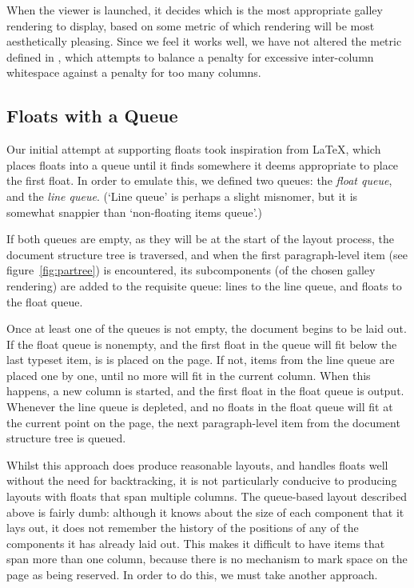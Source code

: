 
When the viewer is launched, it decides which is the most appropriate galley rendering to display, based on some metric of which rendering will be most aesthetically pleasing. Since we feel it works well, we have not altered the metric defined in \cite{Pinkney2011}, which attempts to balance a penalty for excessive inter-column whitespace against a penalty for too many columns. 


\subsection{Floats with a Queue}
Our initial attempt at supporting floats took inspiration from \LaTeX, which places floats into a queue until it finds somewhere it deems appropriate to place the first float. In order to emulate this, we defined two queues: the \emph{float queue}, and the \emph{line queue}. (`Line queue' is perhaps a slight misnomer, but it is somewhat snappier than `non-floating items queue'.)


If both queues are empty, as they will be at the start of the layout process, the document structure tree is traversed, and when the first paragraph-level item (see figure~\ref{fig:partree}) is encountered, its subcomponents (of the chosen galley rendering) are added to the requisite queue: lines to the line queue, and floats to the float queue.

Once at least one of the queues is not empty, the document begins to be laid out. If the float queue is nonempty, and the first float in the queue will fit below the last typeset item, is is placed on the page. If not, items from the line queue are placed one by one, until no more will fit in the current column. When this happens, a new column is started, and the first float in the float queue is output. Whenever the line queue is depleted, and no floats in the float queue will fit at the current point on the page, the next paragraph-level item from the document structure tree is queued. 

Whilst this approach does produce reasonable layouts, and handles floats well without the need for backtracking, it is not particularly conducive to producing layouts with floats that span multiple columns. The queue-based layout described above is fairly dumb: although it knows about the size of each component that it lays out, it does not remember the history of the positions of any of the components it has already laid out. This makes it difficult to have items that span more than one column, because there is no mechanism to mark space on the page as being reserved. In order to do this, we must take another approach.

